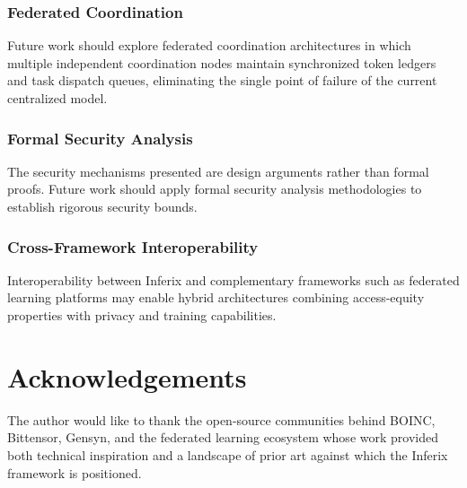\documentclass[12pt]{article}
\begin{document}
\subsubsection{Federated Coordination}

Future work should explore federated coordination architectures in which multiple independent coordination nodes maintain synchronized token ledgers and task dispatch queues, eliminating the single point of failure of the current centralized model.

\subsubsection{Formal Security Analysis}

The security mechanisms presented are design arguments rather than formal proofs. Future work should apply formal security analysis methodologies to establish rigorous security bounds.

\subsubsection{Cross-Framework Interoperability}

Interoperability between Inferix and complementary frameworks such as federated learning platforms may enable hybrid architectures combining access-equity properties with privacy and training capabilities.

\section*{Acknowledgements}

The author would like to thank the open-source communities behind BOINC, Bittensor, Gensyn, and the federated learning ecosystem whose work provided both technical inspiration and a landscape of prior art against which the Inferix framework is positioned.
\end{document}
